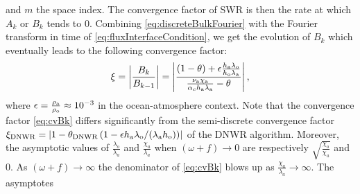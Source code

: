 and $m$ the space index. The convergence factor of SWR is then
the rate at which $A_k$ or $B_k$ tends to 0.
Combining \eqref{eq:discreteBulkFourier} with
the Fourier transform in time of \eqref{eq:fluxInterfaceCondition},
we get the evolution of $B_k$ which eventually leads to 
the following convergence factor: 
%
\begin{equation} \label{eq:cvBk}
\xi = \left|\frac{B_k}{B_{k-1}}\right| = 
\left|\frac{
\left(1-\theta\right)
+ \epsilon\frac{h_{\rm a} \lambda_{\rm o}}{h_{\rm o} \lambda_{\rm a}}
}{
\frac{\nu_{\rm a}\chi_{\rm a}}{\alpha_c h_{\rm a} \lambda_{\rm a}} - \theta}\right|,
\end{equation}
where $\epsilon = \frac{\rho_{\rm a}}{\rho_{\rm o}} \approx 10^{-3}$
in the ocean-atmosphere  context.
Note that the convergence factor \eqref{eq:cvBk} differs significantly from the semi-discrete convergence factor 
$\xi_{\rm DNWR} = \left|1 - \theta_{\rm DNWR} \left(
1 - \epsilon h_{\rm a} \lambda_{\rm o} / (\lambda_{\rm a}h_{\rm o})\right) \right|$ of 
the DNWR algorithm. 
Moreover, the asymptotic values of $\frac{\lambda_o}{\lambda_a}$
and $\frac{\chi_a}{\lambda_a}$ when $(\omega+f) \rightarrow 0$
are respectively $\sqrt{\frac{\chi_o}{\chi_a}}$ and 0.
As $(\omega+f) \rightarrow \infty$ the denominator of
\eqref{eq:cvBk} blows up as
$\frac{\chi_a}{\lambda_a} \rightarrow \infty$. The asymptotes
